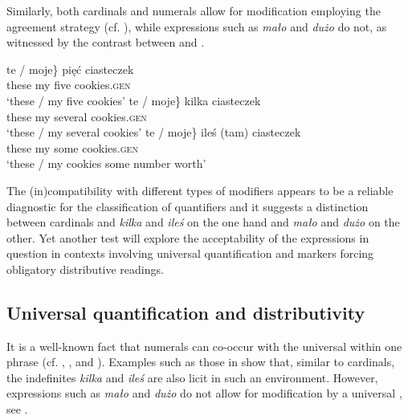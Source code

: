 \documentclass[output=paper, newtxmath, colorlinks, citecolor=brown]{langsci/langscibook}
\begin{document}
\largerpage[2]
	\noindent Similarly, both cardinals and  numerals allow for  modification employing the agreement strategy (cf. \citealt{miechowicz-mathiasen2011syntax}), while expressions such as \textit{mało} and \textit{dużo} do not, as witnessed by the contrast between  and .

	\ea \label{ex:pronominal-modifiers-cardinals} \ea \gll \minsp{\{} te / moje\} pięć ciasteczek\\
	{} these {} my five cookies.\textsc{gen}\\
	\glt `these / my five cookies'
	\ex \gll \minsp{\{} te / moje\} kilka ciasteczek\\
	{} these {} my several cookies.\textsc{gen}\\
	\glt `these / my several cookies'
	\ex \gll \minsp{\{} te / moje\} {ileś (tam)} ciasteczek\\
	{} these {} my some cookies.\textsc{gen}\\
	\glt `these / my cookies some number worth'
	\z
    \z

	\ea \label{ex:pronominal-modifiers-malo} 
	\z
    \z

	\noindent The (in)compatibility with different types of modifiers appears to be a reliable diagnostic for the classification of quantifiers and it suggests a distinction between cardinals and \textit{kilka} and \textit{ileś} on the one hand and \textit{mało} and \textit{dużo} on the other. Yet another test will explore the acceptability of the expressions in question in contexts involving universal quantification and markers forcing obligatory distributive readings.

	\subsection{Universal quantification and distributivity}\label{sec:universal-quantification-and-distributivity}

\largerpage[2]
	It is a well-known fact that  numerals can co-occur with the universal  within one phrase (cf. \citealt{corbett1978universals}, \citealt{gvozdanovic1999some}, and \citealt{miechowicz-mathiasen2011syntax}). Examples such as those in  show that, similar to cardinals, the indefinites \textit{kilka} and \textit{ileś} are also licit in such an environment. However, expressions such as \textit{mało} and \textit{dużo} do not allow for modification by a universal , see .
\end{document}
